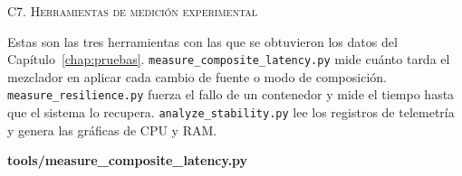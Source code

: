 \clearpage
\vspace{0.4cm}

\label{sec:anexoC7}%
\Large{\textsc{\textcolor{nar}{C7. Herramientas de medición experimental}}}
\vspace{0.2cm}


\normalsize{Estas son las tres herramientas con las que se obtuvieron los datos del
Capítulo~\ref{chap:pruebas}. \texttt{measure\_composite\_latency.py} mide cuánto tarda
el mezclador en aplicar cada cambio de fuente o modo de composición.
\texttt{measure\_resilience.py} fuerza el fallo de un contenedor y mide el tiempo hasta
que el sistema lo recupera. \texttt{analyze\_stability.py} lee los registros de
telemetría y genera las gráficas de CPU y RAM.}
\vspace{0.3cm}

\noindent\textbf{\small tools/measure\_composite\_latency.py}
\vspace{0.1cm}

